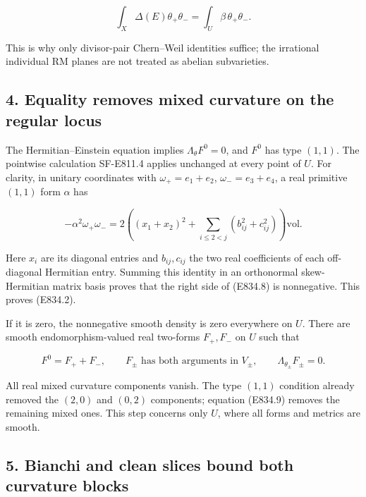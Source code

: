 \[
 \int_X\Delta(E)\theta_+\theta_-
    =\int_U\beta\,\theta_+\theta_-.
 \tag{E834.8}
\]

This is why only divisor-pair Chern--Weil identities suffice; the
irrational individual RM planes are not treated as abelian subvarieties.

\subsection{4. Equality removes mixed curvature on the regular
locus}\label{SF-E834:equality-removes-mixed-curvature-on-the-regular-locus}

The Hermitian--Einstein equation implies \(\Lambda_\theta F^0=0\), and \(F^0\) has
type \((1,1)\). The pointwise calculation SF-E811.4 applies unchanged at
every point of \(U\). For clarity, in unitary coordinates with
\(\omega_+=e_1+e_2\), \(\omega_-=e_3+e_4\), a real primitive \((1,1)\) form \(\alpha\) has

\[
 -\alpha^2\omega_+\omega_-
 =2\left((x_1+x_2)^2+
       \sum_{i\le2<j}(b_{ij}^2+c_{ij}^2)\right)\mathrm{vol}.
 \tag{E834.9}
\]

Here \(x_i\) are its diagonal entries and \(b_{ij},c_{ij}\) the two real
coefficients of each off-diagonal Hermitian entry. Summing this identity
in an orthonormal skew-Hermitian matrix basis proves that the right side
of (E834.8) is nonnegative. This proves (E834.2).

If it is zero, the nonnegative smooth density is zero everywhere on \(U\).
There are smooth endomorphism-valued real two-forms \(F_+,F_-\) on \(U\) such
that

\[
 F^0=F_++F_-,\qquad
 F_\pm\text{ has both arguments in }V_\pm,\qquad
 \Lambda_{\theta_\pm}F_\pm=0.
 \tag{E834.10}
\]

All real mixed curvature components vanish. The type \((1,1)\) condition
already removed the \((2,0)\) and \((0,2)\) components; equation (E834.9) removes
the remaining mixed ones. This step concerns only \(U\), where all forms and
metrics are smooth.

\subsection{5. Bianchi and clean slices bound both curvature
blocks}\label{SF-E834:bianchi-and-clean-slices-bound-both-curvature-blocks}

